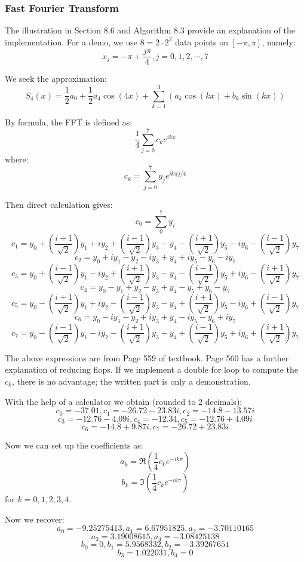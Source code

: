 \documentclass[12pt]{article} %
\newcommand{\1}[1]{\mathds{1}\left[#1\right]}
\begin{document}
\subsubsection{Fast Fourier Transform}
The illustration in Section 8.6 and Algorithm 8.3 provide an explanation of the implementation. For a demo, we use $8=2\cdot 2^2$ data points on $[-\pi, \pi]$, namely:
$$
	x_j = -\pi+\frac{j\pi}{4}, j = 0,1,2,\cdots, 7
$$

We seek the approximation:
$$
	S_4(x) = 
	\frac{1}{2}a_0 + \frac{1}{2}a_4\cos(4x) + \sum_{k=1}^3(a_k\cos(kx) + b_k\sin(kx))
$$

By formula, the FFT is defined as:
$$
	\frac{1}{4}\sum_{j=0}^7 c_ke^{ikx}
$$ where:
$$
	c_k = \sum_{j=0}^7y_je^{ik\pi j/4}
$$

Then direct calculation gives:
$$
	c_0 = \sum_0^7 y_i
$$
$$
	c_1 = y_0+(\frac{i+1}{\sqrt{2}})y_1 + iy_2+(\frac{i-1}{\sqrt{2}})y_3 - y_4- (\frac{i+1}{\sqrt{2}})y_5-iy_6 -(\frac{i-1}{\sqrt{2}})y_7
$$
$$
	c_2 = y_0 + iy_1 - y_2 -iy_3 +y_4 + iy_5 - y_6-iy_7
$$
$$
	c_3 = y_0+(\frac{i-1}{\sqrt{2}})y_1 - iy_2+(\frac{i+1}{\sqrt{2}})y_3 - y_4- (\frac{i-1}{\sqrt{2}})y_5+iy_6 -(\frac{i+1}{\sqrt{2}})y_7
$$
$$
	c_4 = y_0 - y_1 + y_2 -y_3 +y_4 -y_5 + y_6-y_7
$$
$$
	c_5 = y_0-(\frac{i+1}{\sqrt{2}})y_1 + iy_2-(\frac{i-1}{\sqrt{2}})y_3 - y_4+ (\frac{i+1}{\sqrt{2}})y_5-iy_6 +(\frac{i-1}{\sqrt{2}})y_7
$$
$$
	c_6 = y_0 - iy_1 - y_2 +iy_3 +y_4 -iy_5 - y_6+iy_7
$$
$$
	c_7 = y_0-(\frac{i-1}{\sqrt{2}})y_1 - iy_2-(\frac{i+1}{\sqrt{2}})y_3 - y_4+ (\frac{i-1}{\sqrt{2}})y_5+iy_6 +(\frac{i+1}{\sqrt{2}})y_7
$$

The above expressions are from Page 559 of textbook. Page 560 has a further explanation of reducing flops. If we implement a double for loop to compute the $c_k$, there is no advantage; the written part is only a demonstration.

With the help of a calculator we obtain (rounded to 2 decimals):
$$
	c_0 = -37.01, c_1 = -26.72-23.83i, c_2 =-14.8-13.57i
$$
$$
	c_3 = -12.76-4.09i, c_4 = -12.34, c_5 = -12.76+4.09i
$$
$$
	c_6 = -14.8+9.87i, c_7 = -26.72+23.83i
$$

Now we can set up the coefficients as:
$$
	a_k = \Re(\frac{1}{4}c_ke^{-ik\pi})
$$
$$
	b_k = \Im(\frac{1}{4}c_ke^{-ik\pi})
$$ for $k = 0,1,2,3,4$.

Now we recover:
$$
	a_0 = -9.25275413, a_1 = 6.67951825, a_2 = -3.70110165
$$
$$
	a_3 = 3.19008615, a_4 = -3.08425138
$$
$$
	b_0 = 0, b_1 = 5.9568332, b_2 = -3.39267651
$$
$$
	b_3 = 1.022031, b_4 = 0
$$
\end{document}

